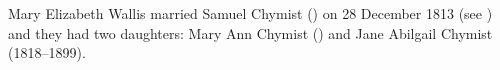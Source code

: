 
Mary Elizabeth Wallis married Samuel Chymist () on 28 December 1813 (see ) and they had two daughters: Mary Ann Chymist () and Jane Abilgail Chymist (1818--1899).
